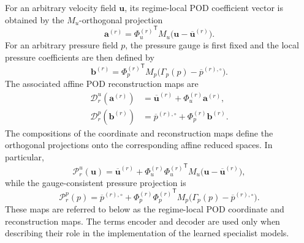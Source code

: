 For an arbitrary velocity field $\boldsymbol{u}$, its regime-local POD
coefficient vector is obtained by the $M_u$-orthogonal projection
\begin{equation}
\boldsymbol{a}^{(r)} = {\Phi_u^{(r)}}^{\mathsf T}M_u
\bigl( \boldsymbol{u} - \overline{\boldsymbol{u}}^{(r)} \bigr).
\label{eq:velocity_encode}
\end{equation}
For an arbitrary pressure field $p$, the pressure gauge is first fixed and
the local pressure coefficients are then defined by
\begin{equation}
\boldsymbol{b}^{(r)} = {\Phi_p^{(r)}}^{\mathsf T}M_p
\bigl( \Gamma_p(p) - \overline{p}^{(r),\circ} \bigr).
\label{eq:pressure_encode}
\end{equation}
The associated affine POD reconstruction maps are
\begin{align}
\mathcal{D}^{u}_{r}(\boldsymbol{a}^{(r)})
&= \overline{\boldsymbol{u}}^{(r)} + \Phi_u^{(r)}\boldsymbol{a}^{(r)},
\label{eq:velocity_decode} \\
\mathcal{D}^{p}_{r}(\boldsymbol{b}^{(r)})
&= \overline{p}^{(r),\circ} + \Phi_p^{(r)}\boldsymbol{b}^{(r)}.
\label{eq:pressure_decode}
\end{align}
The compositions of the coordinate and reconstruction maps define the
orthogonal projections onto the corresponding affine reduced spaces.  In
particular,
\begin{equation}
\mathcal{P}^{u}_{r}(\boldsymbol{u}) = \overline{\boldsymbol{u}}^{(r)}
+ \Phi_u^{(r)}{\Phi_u^{(r)}}^{\mathsf T}M_u
\bigl( \boldsymbol{u} - \overline{\boldsymbol{u}}^{(r)} \bigr),
\label{eq:velocity_affine_pod_projection}
\end{equation}
while the gauge-consistent pressure projection is
\begin{equation}
\mathcal{P}^{p}_{r}(p) = \overline{p}^{(r),\circ}
+ \Phi_p^{(r)}{\Phi_p^{(r)}}^{\mathsf T}M_p
\bigl( \Gamma_p(p) - \overline{p}^{(r),\circ} \bigr).
\label{eq:pressure_affine_pod_projection}
\end{equation}
These maps are referred to below as the regime-local POD coordinate and
reconstruction maps.  The terms encoder and decoder are used only when
describing their role in the implementation of the learned specialist
models.

